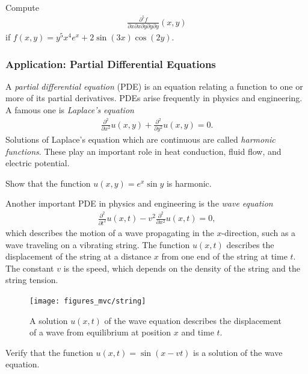 \documentclass[12pt,letterpaper,reqno]{article}
\numberwithin{equation}{section}
\begin{document}
{\begin{exercise}
Compute 
\begin{align*}
	\frac{\partial^5 f}{\partial x \partial x \partial y \partial y \partial y}(x,y)
\end{align*}
if $f(x,y)=y^5x^4e^x+2\sin(3x)\cos(2y)$.	
\end{exercise}

\subsubsection{Application: Partial Differential Equations}
A \emph{partial differential equation} (PDE) is an equation relating a function to one or more of its partial derivatives. PDEs arise frequently in physics and engineering. A famous one is \emph{Laplace's equation}
\begin{align*}
	\frac{\partial^2}{\partial x^2}u(x,y)+\frac{\partial^2}{\partial y^2}u(x,y)=0.
\end{align*}
Solutions of Laplace's equation which are continuous are called \emph{harmonic functions}. These play an important role in heat conduction, fluid flow, and electric potential.

\begin{exercise}
Show that the function $u(x,y)=e^x\sin y$ is harmonic.	
\end{exercise}

Another important PDE in physics and engineering is the \emph{wave equation}
\begin{align*}
	\frac{\partial^2}{\partial t^2}u(x,t)-v^2\frac{\partial^2}{\partial x^2}u(x,t)=0,
\end{align*}
which describes the motion of a wave propagating in the $x$-direction, such as a wave traveling on a vibrating string. The function $u(x,t)$ describes the displacement of the string at a distance $x$ from one end of the string at time $t$. The constant $v$ is the speed, which depends on the density of the string and the string tension.

\begin{figure}[h]
	\begin{center}
		\texttt{[image: figures\_mvc/string]}
	\end{center}
\caption{A solution $u(x,t)$ of the wave equation describes the displacement of a wave from equilibrium at position $x$ and time $t$.}
\end{figure}

\begin{exercise}
Verify that the function $u(x,t)=\sin(x-vt)$ is a solution of the wave equation.	
\end{exercise}



}
\end{document}
